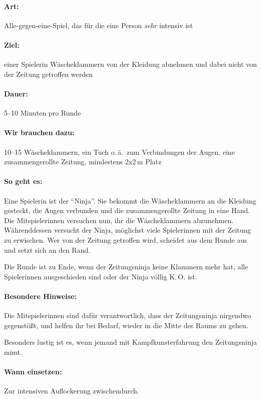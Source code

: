 \paragraph{Art:} Alle-gegen-eine-Spiel, das für die eine Person \emph{sehr} intensiv ist
\paragraph{Ziel:} einer Spielerin  Wäscheklammern von der Kleidung abnehmen und dabei nicht von der Zeitung getroffen werden
\paragraph{Dauer:} 5--10 Minuten pro Runde
\paragraph{Wir brauchen dazu:} 10--15 Wäscheklammern, ein Tuch o.\,ä.~zum Verbindungen der Augen, eine zusammengerollte Zeitung, mindestens 2x2\,m Platz
\paragraph{So geht es:} Eine Spielerin ist der "`Ninja"'. Sie bekommt die Wäscheklammern an die Kleidung gesteckt, die Augen verbunden und die zusammengerollte Zeitung in eine Hand. Die Mitspielerinnen versuchen nun, ihr die Wäscheklammern abzunehmen. Währenddessen versucht der Ninja, möglichst viele Spielerinnen mit der Zeitung zu erwischen. Wer von der Zeitung getroffen wird, scheidet aus dem Runde aus und setzt sich an den Rand.

Die Runde ist zu Ende, wenn der Zeitungsninja keine Klammern mehr hat, alle Spielerinnen ausgeschieden sind oder der Ninja völlig K.\,O. ist.

\paragraph{Besondere Hinweise:} Die Mitspielerinnen sind dafür verantwortlich, dass der Zeitungsninja nirgendwo gegenstößt, und helfen ihr bei Bedarf, wieder in die Mitte des Raums zu gehen.

Besonders lustig ist es, wenn jemand mit Kampfkunsterfahrung den Zeitungsninja mimt.

\paragraph{Wann einsetzen:} Zur intensiven Auflockerung zwischendurch.



